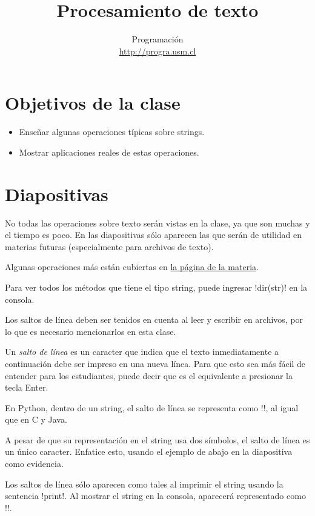 \documentclass[10pt]{article}
\title{Procesamiento de texto}
\author{Programación \\ \url{http://progra.usm.cl}}
\date{}
\begin{document}
  \maketitle

  \section*{Objetivos de la clase}
  \begin{itemize}
    \item Enseñar algunas operaciones típicas
      sobre strings.
    \item Mostrar aplicaciones reales de estas operaciones.
  \end{itemize}

  \section*{Diapositivas}

  No todas las operaciones sobre texto
  serán vistas en la clase,
  ya que son muchas y el tiempo es poco.
  En las diapositivas sólo aparecen
  las que serán de utilidad en materias futuras
  (especialmente para archivos de texto).

  Algunas operaciones más
  están cubiertas en \href{http://progra.usm.cl/materia/texto.html}{la página de la materia}.

  Para ver todos los métodos que tiene el tipo string,
  puede ingresar \li!dir(str)! en la consola.


  Los saltos de línea deben ser tenidos en cuenta
  al leer y escribir en archivos,
  por lo que es necesario mencionarlos en esta clase.

  Un \emph{salto de línea}
  es un caracter que indica que el texto inmediatamente a continuación
  debe ser impreso en una nueva línea.
  Para que esto sea más fácil de entender para los estudiantes,
  puede decir que es el equivalente a presionar la tecla Enter.

  En Python, dentro de un string, el salto de línea se representa
  como \li!\n!, al igual que en C y Java.

  A pesar de que su representación en el string usa dos símbolos,
  el salto de línea es un único caracter.
  Enfatice esto,
  usando el ejemplo de abajo en la diapositiva como evidencia.

  Los saltos de línea sólo aparecen como tales
  al imprimir el string usando la sentencia \li!print!.
  Al mostrar el string en la consola,
  aparecerá representado como \li!\n!.
\end{document}
